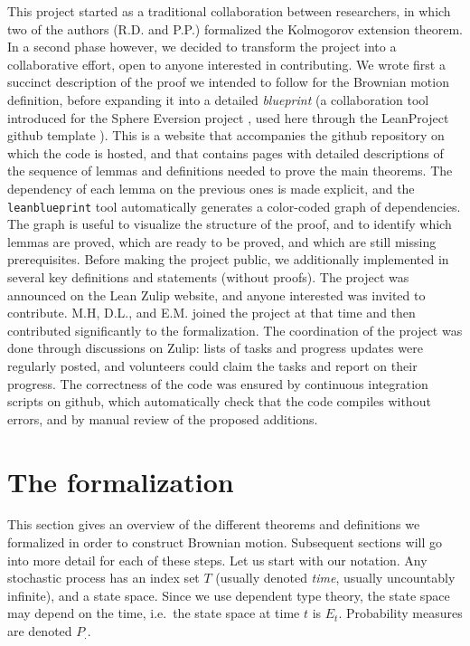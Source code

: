 \documentclass[lean]{Draft}
\begin{document}
This project started as a traditional collaboration between researchers, in which two of the authors (R.D. and P.P.) formalized the Kolmogorov extension theorem.
In a second phase however, we decided to transform the project into a collaborative effort, open to anyone interested in contributing.
We wrote first a succinct description of the proof we intended to follow for the Brownian motion definition, before expanding it into a detailed \emph{blueprint} (a collaboration tool introduced for the Sphere Eversion project \cite{sphere_eversion}, used here through the LeanProject github template \cite{Monticone_LeanProject_2025}).
This is a website that accompanies the github repository on which the code is hosted, and that contains pages with detailed descriptions of the sequence of lemmas and definitions needed to prove the main theorems.
The dependency of each lemma on the previous ones is made explicit, and the \texttt{leanblueprint} tool automatically generates a color-coded graph of dependencies.
The graph is useful to visualize the structure of the proof, and to identify which lemmas are proved, which are ready to be proved, and which are still missing prerequisites.
Before making the project public, we additionally implemented in \Lean several key definitions and statements (without proofs).
The project was announced on the Lean Zulip website, and anyone interested was invited to contribute.
M.H, D.L., and E.M. joined the project at that time and then contributed significantly to the formalization.
The coordination of the project was done through discussions on Zulip: lists of tasks and progress updates were regularly posted, and volunteers could claim the tasks and report on their progress.
The correctness of the code was ensured by continuous integration scripts on github, which automatically check that the code compiles without errors, and by manual review of the proposed additions.



\section{The formalization}
This section gives an overview of the different theorems and definitions we formalized in order to construct Brownian motion. Subsequent sections will go into more detail for each of these steps.
Let us start with our notation.
Any stochastic process has an index set $T$ (usually denoted {\em time}, usually uncountably infinite), and a state space.
Since we use dependent type theory, the state space may depend on the time, i.e.\ the state space at time $t$ is $E_t$. Probability measures are denoted $P_.$.
\end{document}
